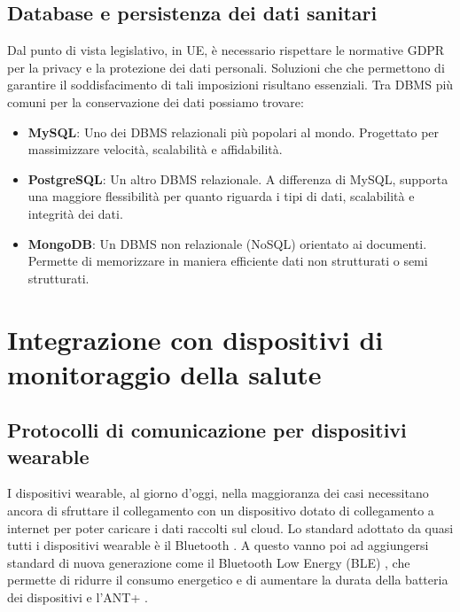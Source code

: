 \documentclass[12pt,a4paper,oneside]{report}
\begin{document}
\subsection{Database e persistenza dei dati sanitari}

Dal punto di vista legislativo, in UE, è necessario rispettare le normative GDPR \cite{GDPR} per la privacy e la protezione dei dati personali. Soluzioni che che permettono di garantire il soddisfacimento di tali imposizioni risultano essenziali.
Tra DBMS più comuni per la conservazione dei dati possiamo trovare:

\begin{itemize}
  \item \textbf{MySQL}: Uno dei DBMS relazionali più popolari al mondo. Progettato per massimizzare velocità, scalabilità e affidabilità. \cite{mysql}
  \item \textbf{PostgreSQL}: Un altro DBMS relazionale. A differenza di MySQL, supporta una maggiore flessibilità per quanto riguarda i tipi di dati, scalabilità e integrità dei dati. \cite{postgresql}
  \item \textbf{MongoDB}: Un DBMS non relazionale (NoSQL) orientato ai documenti. Permette di memorizzare in maniera efficiente dati non strutturati o semi strutturati. \cite{mongodb}

\end{itemize}

\section{Integrazione con dispositivi di monitoraggio della salute}

\subsection{Protocolli di comunicazione per dispositivi wearable}
I dispositivi wearable, al giorno d'oggi, nella maggioranza dei casi necessitano ancora di sfruttare il collegamento con un dispositivo dotato di collegamento a internet per poter caricare i dati raccolti sul cloud.
Lo standard adottato da quasi tutti i dispositivi wearable è il Bluetooth \cite{bluetooth}. A questo vanno poi ad aggiungersi standard di nuova generazione come il Bluetooth Low Energy (BLE) \cite{ble}, che permette di ridurre il consumo energetico e di aumentare la durata della batteria dei dispositivi e l'ANT+ \cite{ant}.
\end{document}

